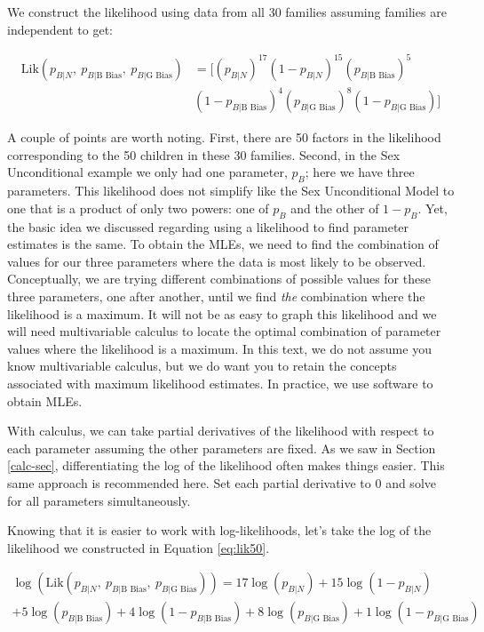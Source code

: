 \documentclass[
]{krantz}
\newcommand{\lik}{\mathrm{Lik}}
\newcommand{\neutral}{p_{B|N}}
\newcommand{\gbias}{p_{B|\textrm{G Bias}}}
\newcommand{\bbias}{p_{B|\textrm{B Bias}}}
\begin{document}
We construct the likelihood using data from all 30 families assuming families are independent to get:

\begin{equation}
\begin{split}
 \lik(\neutral,\ \bbias,\ \gbias) &= 
 \big[(\neutral)^{17}
 (1-\neutral)^{15}
 (\bbias)^{5} \\
 &{}(1-\bbias)^{4}
 (\gbias)^{8}
 (1-\gbias) \big]
\end{split}
\label{eq:lik50}
\end{equation}

A couple of points are worth noting. First, there are 50 factors in the likelihood corresponding to the 50 children in these 30 families. Second, in the Sex Unconditional example we only had one parameter, \(p_{B}\); here we have three parameters. This likelihood does not simplify like the Sex Unconditional Model to one that is a product of only two powers: one of \(p_B\) and the other of \(1-p_B\). Yet, the basic idea we discussed regarding using a likelihood to find parameter estimates is the same. To obtain the MLEs, we need to find the combination of values for our three parameters where the data is most likely to be observed. Conceptually, we are trying different combinations of possible values for these three parameters, one after another, until we find \emph{the} combination where the likelihood is a maximum. It will not be as easy to graph this likelihood and we will need multivariable calculus to locate the optimal combination of parameter values where the likelihood is a maximum. In this text, we do not assume you know multivariable calculus, but we do want you to retain the concepts associated with maximum likelihood estimates. In practice, we use software to obtain MLEs.

With calculus, we can take partial derivatives of the likelihood with respect to each parameter assuming the other parameters are fixed. As we saw in Section \ref{calc-sec}, differentiating the log of the likelihood often makes things easier. This same approach is recommended here. Set each partial derivative to 0 and solve for all parameters simultaneously.

Knowing that it is easier to work with log-likelihoods, let's take the log of the likelihood we constructed in Equation \eqref{eq:lik50}.

\begin{multline*}
\log (\lik(\neutral,\ \bbias,\ \gbias)) = 
        17\log(\neutral)+15\log(1-\neutral) \\
        +5\log(\bbias)+4\log(1-\bbias) 
        +8\log(\gbias)+1\log(1-\gbias)
\end{multline*}
\end{document}
